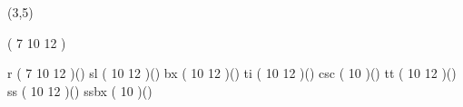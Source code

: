 %
%
%
%
%
%
%

\lhvercheck(3,5)


     \tablevalues                     ( 7 10 12 )

     \makefont \fonttwoletters r      ( 7 10 12 )()
     \makefont \fonttwoletters sl     (   10 12 )()
     \makefont \fonttwoletters bx     (   10 12 )()
     \makefont \fonttwoletters ti     (   10 12 )()
     \makefont \fonttwoletters csc    (   10    )()
     \makefont \fonttwoletters tt     (   10 12 )()
     \makefont \fonttwoletters ss     (   10 12 )()
     \makefont \fonttwoletters ssbx   (   10    )()
